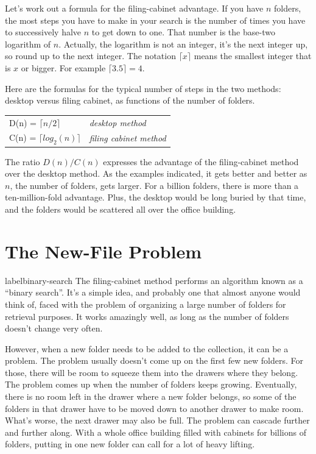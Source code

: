 Let's work out a formula for the filing-cabinet advantage. If you
have $n$ folders, the most steps you have to make in your search is
the number of times you have to successively halve $n$ to get down
to one. That number is the base-two logarithm of $n$. Actually,
the logarithm is not an integer, it's the next integer up, so
round up to the next integer.
The notation $\lceil x \rceil$ means the smallest integer that is
$x$ or bigger.
For example $\lceil 3.5 \rceil = 4$.

Here are the formulas for the typical number of steps in the two
methods: desktop versus filing cabinet, as functions of the number
of folders. \newline


\begin{tabular}{ll}
D(n) = $\lceil n/2 \rceil$      &  \emph{desktop method} \\
C(n) = $\lceil log_2(n) \rceil$ & \emph{filing cabinet method} \\
\end{tabular}

The ratio $D(n)/C(n)$ expresses the advantage of the filing-cabinet
method over the desktop method. As the examples indicated, it gets
better and better as $n$, the number of folders, gets larger. For a
billion folders, there is more than a ten-million-fold advantage.
Plus, the desktop would be long buried by that time,
and the folders would be scattered all over the office building.

\section{The New-File Problem}

label{binary-search}
The filing-cabinet method performs an algorithm known as a
``binary search''.
It's a simple idea, and
probably one that almost anyone would think of, faced with the
problem of organizing a large number of folders for retrieval
purposes. It works amazingly well, as long as the number
of folders doesn't change very often.

However, when a new folder needs to be added to the
collection, it can be a problem. The problem usually doesn't come up
on the first few new folders. For those, there will be room to
squeeze them into the drawers where they belong. The problem comes
up when the number of folders keeps growing. Eventually, there is no
room left in the drawer where a new folder belongs, so some of the
folders in that drawer have to be moved down to another drawer to
make room. What's worse, the next drawer may also be full. The
problem can cascade further and further along. With a whole office
building filled with cabinets for billions of folders, putting in
one new folder can call for a lot of heavy lifting.


